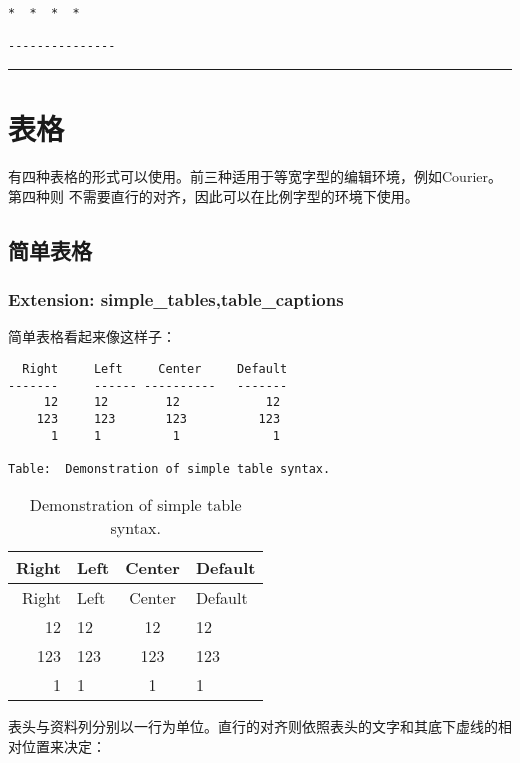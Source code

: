 \documentclass[fancyhdr,bookmark]{ctexbook}
\begin{document}
\begin{lstlisting}
*  *  *  *

---------------
\end{lstlisting}

\begin{center}\rule{0.5\linewidth}{\linethickness}\end{center}

\section{表格}\label{ux8868ux683c}

有四种表格的形式可以使用。前三种适用于等宽字型的编辑环境，例如Courier。第四种则
不需要直行的对齐，因此可以在比例字型的环境下使用。

\subsection{简单表格}\label{ux7b80ux5355ux8868ux683c}

\subsubsection{Extension:
simple\_tables,table\_captions}\label{extension-simpleux5ftablestableux5fcaptions}

简单表格看起来像这样子：

\begin{lstlisting}
  Right     Left     Center     Default
-------     ------ ----------   -------
     12     12        12            12
    123     123       123          123
      1     1          1             1

Table:  Demonstration of simple table syntax.
\end{lstlisting}

\begin{longtable}[c]{@{}rlcl@{}}
\caption{Demonstration of simple table syntax.}\tabularnewline
\toprule
Right & Left & Center & Default\tabularnewline
\midrule
\endfirsthead
\toprule
Right & Left & Center & Default\tabularnewline
\midrule
\endhead
12 & 12 & 12 & 12\tabularnewline
123 & 123 & 123 & 123\tabularnewline
1 & 1 & 1 & 1\tabularnewline
\bottomrule
\end{longtable}

表头与资料列分别以一行为单位。直行的对齐则依照表头的文字和其底下虚线的相对位置来决定：
\end{document}
